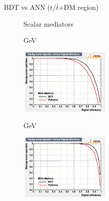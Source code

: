 \documentclass[8pt]{beamer}
\begin{document}
\begin{frame}{BDT vs ANN ($t/\bar t$+DM region)}
\justifying

\begin{figure}[htbp]
\centering
\begin{block}{ \centering Scalar mediators}\end{block} \vspace{-10pt}
\begin{minipage}[b]{.49\textwidth}
\begin{center}
\begin{block}{  GeV}\end{block}
\includegraphics[width=4.5cm, height=3.2cm]{figs/ROC_scalar100_ST.png}
\end{center}
\end{minipage} \hfill
\begin{minipage}[b]{.49\textwidth}
\begin{center}
\begin{block}{  GeV}\end{block}
\includegraphics[width=4.5cm, height=3.2cm]{figs/ROC_scalar500_ST.png}
\end{center}
\end{minipage} \hfill


\end{figure}
\end{frame}
\end{document}
